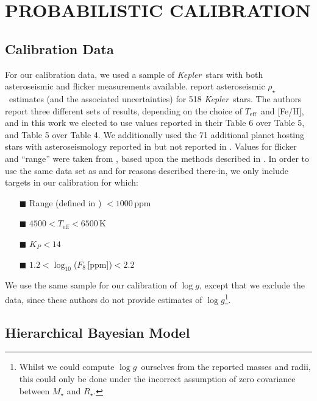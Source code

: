 \documentclass[apjl]{emulateapj}
\newcommand{\logg}{$\log g$}
\newcommand{\rhostar}{$\rho_{\star}$}
\newcommand{\Teff}{$T_{\mathrm{eff}}$}
\newcommand{\FeH}{[Fe/H]}
\newcommand{\Kepler}{\textit{Kepler}}
\begin{document}
\section{PROBABILISTIC CALIBRATION}
\label{sec:HBM}


\subsection{Calibration Data}

For our calibration data, we used a sample of \Kepler\ stars with
both asteroseismic and flicker measurements available. \citet{chaplin:2014}
report asteroseismic \rhostar\ estimates (and the associated uncertainties) for
518 \Kepler\ stars. The authors report three different sets of results,
depending on the choice of \Teff\ and \FeH, and in this work we elected to use
values reported in their Table 6 over Table 5, and Table 5 over Table 4. We
additionally used the 71 additional planet hosting stars with asteroseismology
reported in \citet{huber:2013} but not reported in \citet{chaplin:2014}. Values
for flicker and ``range'' were taken from \citet{kipping:2014}, based upon the
methods described in \citet{bastien:2013}.
In order to use the same data set as \citet{kipping:2014} and
for reasons described there-in, we only include targets in our calibration for
which:

\begin{itemize}
\item[{\tiny$\blacksquare$}] Range (defined in \citealt{bastien:2013})
$<1000$\,ppm
\item[{\tiny$\blacksquare$}] $4500<T_{\mathrm{eff}}<6500$\,K
\item[{\tiny$\blacksquare$}] $K_P<14$
\item[{\tiny$\blacksquare$}] $1.2 < \log_{10}$($F_8$\,[ppm])$< 2.2$
\end{itemize}

We use the same sample for our calibration of \logg, except that we exclude the
\citet{huber:2013} data, since these authors do not provide estimates of
\logg\footnote{Whilst we could compute \logg\ ourselves from the reported
masses and radii, this could only be done under the incorrect assumption of
zero covariance between $M_{\star}$ and $R_{\star}$.}.

\subsection{Hierarchical Bayesian Model}
\end{document}
